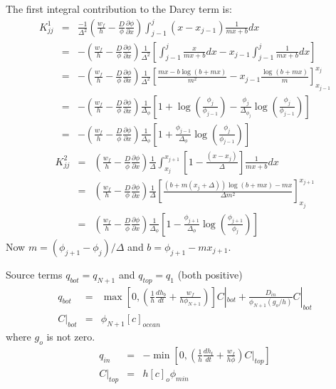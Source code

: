 The first integral contribution to the Darcy term is:
\begin{eqnarray}
K^1_{jj} & = &
\frac{-1}{\Delta ^2}\left(\frac{w_f}{h}-\frac{D}{\phi}\frac{\partial
    \phi}{\partial x}\right)\int_{j-1}^{j}(x-x_{j-1})\frac{1}{mx
  + b}dx \nonumber \\
& = &-\left(\frac{w_f}{h}-\frac{D}{\phi}\frac{\partial
    \phi}{\partial x}\right) \frac{1}{\Delta^2}\left[ \int_{j-1}^{j}\frac{x}{mx + b}dx - x_{j-1}\int_{j-1}^{j}\frac{1}{mx
  + b}dx  \right] \nonumber \\
& = &- \left(\frac{w_f}{h}-\frac{D}{\phi}\frac{\partial
    \phi}{\partial x}\right) \frac{1}{\Delta^2}\left[ \frac{mx - b\log(b + mx)}{m^2} -
  x_{j-1}\frac{\log(b+mx)}{m}\right]^{x_j}_{x_{j-1}} \nonumber \\
& = & -\left(\frac{w_f}{h}-\frac{D}{\phi}\frac{\partial
    \phi}{\partial x}\right)\frac{1}{\Delta_{\phi}}\left[ 1 + \log \left( \frac{\phi_j}{\phi_{j-1}} \right) -
  \frac{\phi_j}{\Delta_{\phi_j}}\log \left(
    \frac{\phi_j}{\phi_{j-1}} \right)\right] \nonumber \\
& = & -\left(\frac{w_f}{h}-\frac{D}{\phi}\frac{\partial
    \phi}{\partial x}\right)\frac{1}{\Delta_{\phi}}\left[ 1 +  \frac{\phi_{j-1}}{\Delta_{\phi}}\log \left( \frac{\phi_j}{\phi_{j-1}} \right) \right]
\end{eqnarray}
\begin{eqnarray}
K^2_{jj} & = & \left(\frac{w_f}{h}-\frac{D}{\phi}\frac{\partial
    \phi}{\partial x}\right)\frac{1}{\Delta}\int_{x_{j}}^{x_{j+1}}\left[1 -
  \frac{(x-x_{j})}{\Delta}\right]\frac{1}{mx+b} dx \nonumber \\
& = & \left(\frac{w_f}{h}-\frac{D}{\phi}\frac{\partial
    \phi}{\partial x}\right)\frac{1}{\Delta}\left[\frac{
    (b+m(x_j+\Delta))\log(b+mx)-mx}{\Delta
    m^2}\right]_{x_{j}}^{x_{j+1}} \nonumber \\
& = & \left(\frac{w_f}{h}-\frac{D}{\phi}\frac{\partial
    \phi}{\partial x}\right)\frac{1}{\Delta_{\phi}}\left[ 1 -  \frac{\phi_{j+1}}{\Delta_{\phi}}\log \left( \frac{\phi_{j+1}}{\phi_{j}} \right) \right]
\end{eqnarray}
Now $m = (\phi_{j+1}-\phi_{j})/\Delta$ and $b = \phi_{j+1} -
mx_{j+1}$.

Source terms $q_{bot} = q_{N+1}$ and $q_{top} = q_{1}$ (both positive)  
\begin{eqnarray}  
q_{bot} & = &\max\left[0, \left(\frac{1}{h}\frac{dh_b}{dt} +
\frac{w_f}{h \phi_{N+1}}\right)\right]C|_{bot} +
\frac{D_{in}}{\phi_{N+1}(g_o/h)}C|_{bot} \nonumber \\
  C|_{bot}&= & \phi_{N+1}[c]_{ocean}
\end{eqnarray}
where $g_o$ is not zero.
\begin{eqnarray}
q_{in}&  = & -\min\left[ 0, \left(\frac{1}{h}\frac{dh_t}{dt} +
\frac{w_f}{h\phi}\right)C|_{top} \right]  \nonumber \\
C|_{top}& = & h [c]_o\phi_{min}
\end{eqnarray}

